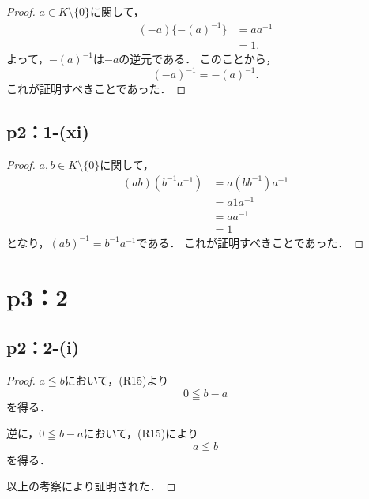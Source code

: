 \documentclass[a4paper,10pt,fleqn]{ltjsarticle}
\begin{document}
\begin{leftbar}
    \begin{proof}
        $ a \in K \setminus \{ 0 \} $に関して，
        \begin{align*}
            (-a) \{ -(a)^{-1} \} & = aa^{-1} \\
                                 & =1.
        \end{align*}
        よって，$-(a)^{-1}$は$-a$の逆元である．
        このことから，
        \[
            (-a)^{-1} = -(a)^{-1}.
        \]
        これが証明すべきことであった．
    \end{proof}
\end{leftbar}
\subsection*{p2：1-(xi)}
\begin{leftbar}
    \begin{proof}
        $ a ,b\in K \setminus \{ 0 \} $に関して，
        \begin{align*}
            (ab) (b^{-1} a^{-1}) & = a (bb^{-1}) a^{-1} \\
                                 & = a1a^{-1}           \\
                                 & = aa^{-1}            \\
                                 & = 1
        \end{align*}
        となり，$(ab)^{-1} = b^{-1} a^{-1}$である．
        これが証明すべきことであった．
    \end{proof}
\end{leftbar}
%
\newpage
\section*{p3：2}

\subsection*{p2：2-(i)}

\begin{leftbar}
    \begin{proof}
        $a \leqq b$において，(R15)より
        \[
            0 \leqq b-a
        \]
        を得る．

        逆に，$0 \leqq b-a$において，(R15)により
        \[
            a \leqq b
        \]
        を得る．

        以上の考察により証明された．
    \end{proof}
\end{leftbar}
\end{document}
